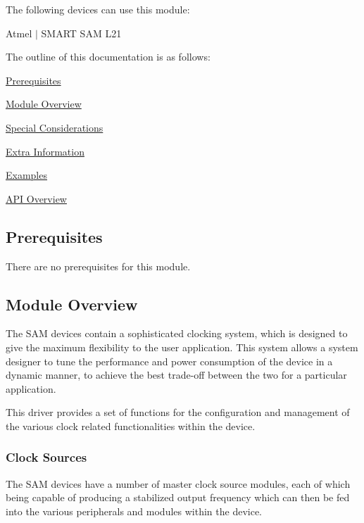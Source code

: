 The following devices can use this module\+:
\begin{DoxyItemize}
\item Atmel $\vert$ S\+M\+A\+R\+T S\+A\+M L21
\end{DoxyItemize}

The outline of this documentation is as follows\+:
\begin{DoxyItemize}
\item \hyperlink{group__asfdoc__sam0__system__clock__group_asfdoc_sam0_system_clock_prerequisites}{Prerequisites}
\item \hyperlink{group__asfdoc__sam0__system__clock__group_asfdoc_sam0_system_clock_module_overview}{Module Overview}
\item \hyperlink{group__asfdoc__sam0__system__clock__group_asfdoc_sam0_system_clock_special_considerations}{Special Considerations}
\item \hyperlink{group__asfdoc__sam0__system__clock__group_asfdoc_sam0_system_clock_extra_info}{Extra Information}
\item \hyperlink{group__asfdoc__sam0__system__clock__group_asfdoc_sam0_system_clock_examples}{Examples}
\item \hyperlink{group__asfdoc__sam0__system__clock__group_asfdoc_sam0_system_clock_api_overview}{A\+P\+I Overview}
\end{DoxyItemize}\hypertarget{group__asfdoc__sam0__system__clock__group_asfdoc_sam0_system_clock_prerequisites}{}\subsection{Prerequisites}\label{group__asfdoc__sam0__system__clock__group_asfdoc_sam0_system_clock_prerequisites}
There are no prerequisites for this module.\hypertarget{group__asfdoc__sam0__system__clock__group_asfdoc_sam0_system_clock_module_overview}{}\subsection{Module Overview}\label{group__asfdoc__sam0__system__clock__group_asfdoc_sam0_system_clock_module_overview}
The S\+A\+M devices contain a sophisticated clocking system, which is designed to give the maximum flexibility to the user application. This system allows a system designer to tune the performance and power consumption of the device in a dynamic manner, to achieve the best trade-\/off between the two for a particular application.

This driver provides a set of functions for the configuration and management of the various clock related functionalities within the device.\hypertarget{group__asfdoc__sam0__system__clock__group_asfdoc_sam0_system_clock_module_overview_clock_sources}{}\subsubsection{Clock Sources}\label{group__asfdoc__sam0__system__clock__group_asfdoc_sam0_system_clock_module_overview_clock_sources}
The S\+A\+M devices have a number of master clock source modules, each of which being capable of producing a stabilized output frequency which can then be fed into the various peripherals and modules within the device.

